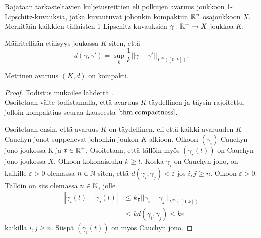 \documentclass[12pt,oneside,a4paper]{amsbook} %
\begin{document}
Rajataan tarkasteltavien kuljetusreittien eli polkujen avaruus
joukkoon 1-Lipschitz-kuvauksia, jotka kuvautuvat johonkin kompaktiin $\mathbb{R}^n$ osajoukkoon $X$. Merkitään kaikkien tällaisten 1-Lipschitz kuvauksien $\gamma: {\mathbb{R}^{+}} \to X$  joukkoa $K$. 

\begin{definition}
    Määritellään etäisyys joukossa $K$ siten, että
    \[d(\gamma, \gamma') = \sup_k \frac{1}{k}||\gamma - \gamma'||_{L^\infty([0,k])}.\]
\end{definition}

\begin{theorem}\label{le:compactnessOfK}
    Metrinen avaruus $(K, d)$ on kompakti.
\end{theorem}
\begin{proof}
    Todistus mukailee lähdettä \cite[s.26]{optimal}. \\
    Osoitetaan väite todistamalla, että avaruus $K$ täydellinen ja täysin rajoitettu, jolloin kompaktius seuraa Lauseesta $\ref{thm:compactness}$.
    
    Osoitetaan ensin, että avaruus $K$ on täydellinen, eli että kaikki avaruuden $K$ Cauchyn jonot suppenevat johonkin joukon $K$ alkioon. Olkoon $(\gamma_i)$ Cauchyn jono joukossa K ja $t\in {\mathbb{R}^{+}}$. Osoitetaan, että tällöin myös $(\gamma_i(t))$ on Cauchyn jono joukossa $X$. Olkoon kokonaisluku $k \ge t$. Koska $\gamma_i$ on Cauchyn jono, on kaikille $\varepsilon > 0$ olemassa $n \in \mathbb{N}$ siten, että $d(\gamma_i, \gamma_j) < \varepsilon$ jos $i, j \ge n$. Olkoon $\varepsilon > 0$. Tällöin on siis olemassa $n \in \mathbb{N}$, jolle
    \begin{align*}
        |\gamma_i(t)-\gamma_j(t)| &\le k\frac{1}{k} ||\gamma_i - \gamma_j||_{L^\infty{([0,k])}} \\ 
        &\le k d(\gamma_i, \gamma_j) \le k\varepsilon
    \end{align*}
    kaikilla $i, j \ge n$. Siispä $(\gamma_i(t))$ on myös Cauchyn jono.
    

\end{proof}
\end{document}
